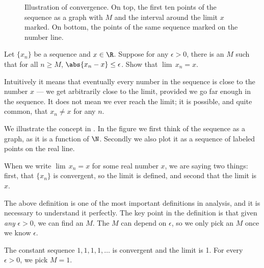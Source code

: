 \documentclass[12pt]{book}
\begin{document}
\begin{figure}[h!t]
\begin{center}


\vspace*{12pt}

\hspace{13pt} 
\caption{Illustration of convergence.
On top, the first ten points of the sequence as a graph
with $M$ and the interval around the limit $x$ marked.
On bottom, the points of the same sequence marked on the
number line.\label{figsequenceconvergence}}
\end{center}
\end{figure}

\begin{exercise}
Let $\{ x_n \}$ be a sequence and $x \in \R$.
Suppose for any $\epsilon > 0$, there is an $M$ such that for
all $n \geq M$, $\abs{x_n-x} \leq \epsilon$.
Show that $\lim\, x_n = x$.
\end{exercise}

Intuitively it means that eventually every number in the sequence is close to the number $x$ --- we get arbitrarily close to the limit, provided we go far enough in the sequence.
It does not mean we ever reach the limit; it is possible,
and quite common, that $x_n\ne x$ for any $n$.

We illustrate the concept in .
In the
figure we first think of the sequence as a graph, as it is a function of
$\N$.
 Secondly we also plot it as a sequence of labeled points on the real
line.

When we write $\lim\, x_n = x$ for some real number $x$, we are saying two things:
first, that $\{ x_n \}$ is convergent, so the limit is defined, 
and second that the limit is $x$.

The above definition is one of the most important definitions in analysis, and it is necessary to understand it perfectly.
The key point in the definition is that given \emph{any} $\epsilon > 0$, we can find an $M$.
The $M$ can depend on $\epsilon$, so we only pick an $M$ once we know $\epsilon$.

\begin{example}
The constant sequence $1,1,1,1,\ldots$ is convergent and the limit is 1.
For
every $\epsilon > 0$, we pick $M = 1$.
\end{example}
\end{document}
